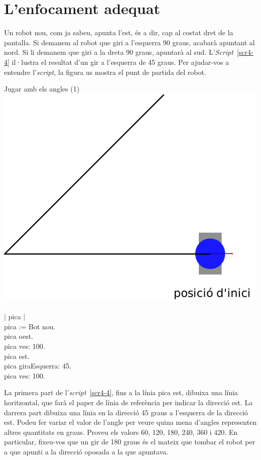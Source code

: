 \section{L'enfocament adequat}
Un robot nou, com ja sabeu, apunta l'est, és a dir, cap al costat dret de la pantalla. Si demanem al robot que giri a l'esquerra 90 graus, acabarà apuntant al nord. Si li demanem que giri a la dreta 90 graus, apuntarà al sud. L'\emph{Script}~\ref{scr4-4} il·lustra el resultat d'un gir a l'esquerra de 45 graus. Per ajudar-vos a entendre l'\emph{script}, la figura us mostra el punt de partida del robot.

\begin{script}  Jugar amb els angles (1)
\newline
\newline
\noindent
\includegraphics[scale=0.5]{Imatges/figuraS4-4.pdf} 
\noindent
\textsf{\upshape
\\
\\$|$ pica $|$\\
pica := Bot nou.\\
pica oest.\\
pica ves: 100.\\
pica est.\\
pica giraEsquerra: 45.\\
pica ves: 100.\\
}
\label{scr4-4}
\end{script}

La primera part de l'\emph{script}~\ref{scr4-4}, fins a la línia \textsf{pica est}, dibuixa una línia horitzontal, que farà el paper de línia de referència per indicar la direcció est. La darrera part dibuixa una línia en la direcció 45 graus a l'esquerra de la direcció est. Podeu fer variar
el valor de l'angle per veure quina mena d'angles representen altres quantitats en graus. Proveu els valors 60, 120, 180, 240, 360 i 420. En particular, fixeu-vos que un gir de 180 graus és el mateix que tombar el robot per a que apunti a la direcció oposada a la que apuntava.  

